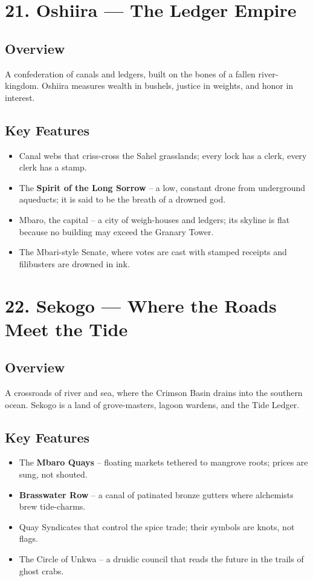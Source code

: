 \documentclass[11pt]{article}
\begin{document}
\section*{21. Oshiira --- The Ledger Empire}

\subsection*{Overview}
A confederation of canals and ledgers, built on the bones of a fallen river-kingdom. Oshiira measures wealth in bushels, justice in weights, and honor in interest.

\subsection*{Key Features}
\begin{itemize}[leftmargin=*]
    \item Canal webs that criss-cross the Sahel grasslands; every lock has a clerk, every clerk has a stamp.
    \item The \textbf{Spirit of the Long Sorrow} -- a low, constant drone from underground aqueducts; it is said to be the breath of a drowned god.
    \item Mbaro, the capital -- a city of weigh-houses and ledgers; its skyline is flat because no building may exceed the Granary Tower.
    \item The Mbari-style Senate, where votes are cast with stamped receipts and filibusters are drowned in ink.
\end{itemize}

\section*{22. Sekogo --- Where the Roads Meet the Tide}

\subsection*{Overview}
A crossroads of river and sea, where the Crimson Basin drains into the southern ocean. Sekogo is a land of grove-masters, lagoon wardens, and the Tide Ledger.

\subsection*{Key Features}
\begin{itemize}[leftmargin=*]
    \item The \textbf{Mbaro Quays} -- floating markets tethered to mangrove roots; prices are sung, not shouted.
    \item \textbf{Brasswater Row} -- a canal of patinated bronze gutters where alchemists brew tide-charms.
    \item Quay Syndicates that control the spice trade; their symbols are knots, not flags.
    \item The Circle of Unkwa -- a druidic council that reads the future in the trails of ghost crabs.
\end{itemize}
\end{document}
